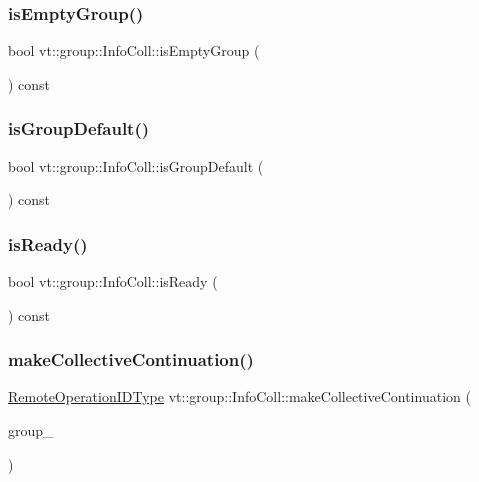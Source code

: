 \subsubsection{\texorpdfstring{is\+Empty\+Group()}{isEmptyGroup()}}
{\footnotesize\ttfamily bool vt\+::group\+::\+Info\+Coll\+::is\+Empty\+Group (\begin{DoxyParamCaption}{ }\end{DoxyParamCaption}) const}

\mbox{\label{structvt_1_1group_1_1_info_coll_a6adf605b8d46a4174a8fd1321fd8fd3f}} 
\subsubsection{\texorpdfstring{is\+Group\+Default()}{isGroupDefault()}}
{\footnotesize\ttfamily bool vt\+::group\+::\+Info\+Coll\+::is\+Group\+Default (\begin{DoxyParamCaption}{ }\end{DoxyParamCaption}) const}

\mbox{\label{structvt_1_1group_1_1_info_coll_aec831cf27c5e2492657c5a2209718ae0}} 
\subsubsection{\texorpdfstring{is\+Ready()}{isReady()}}
{\footnotesize\ttfamily bool vt\+::group\+::\+Info\+Coll\+::is\+Ready (\begin{DoxyParamCaption}{ }\end{DoxyParamCaption}) const}

\mbox{\label{structvt_1_1group_1_1_info_coll_a1272a60bb7397d4434e16d6d02b7506e}} 
\subsubsection{\texorpdfstring{make\+Collective\+Continuation()}{makeCollectiveContinuation()}}
{\footnotesize\ttfamily \hyperlink{namespacevt_1_1group_a73f2624ddeb535b39a08b6524f26b244}{Remote\+Operation\+I\+D\+Type} vt\+::group\+::\+Info\+Coll\+::make\+Collective\+Continuation (\begin{DoxyParamCaption}\item[{\hyperlink{namespacevt_a27b5e4411c9b6140c49100e050e2f743}{Group\+Type} const}]{group\+\_\+ }\end{DoxyParamCaption})\hspace{0.3cm}{\ttfamily [private]}}

